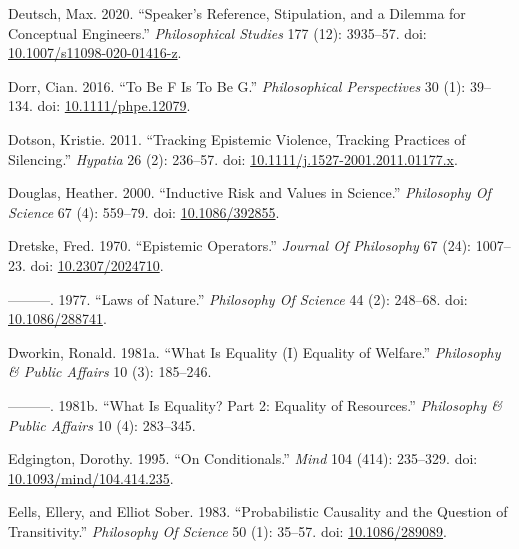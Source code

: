 \documentclass[
  10pt,
  letterpaper,
  DIV=11,
  numbers=noendperiod,
  twoside]{scrartcl}
\newlength{\cslhangindent}
\newenvironment{CSLReferences}[2] %
 {\begin{list}{}{%
  \setlength{\itemindent}{0pt}
  \setlength{\leftmargin}{0pt}
  \setlength{\parsep}{0pt}
  \ifodd #1
   \setlength{\leftmargin}{\cslhangindent}
   \setlength{\itemindent}{-1\cslhangindent}
  \fi
  \setlength{\itemsep}{#2\baselineskip}}}
 {\end{list}}
\begin{document}
\begin{CSLReferences}{1}{0}
Deutsch, Max. 2020. {``Speaker's Reference, Stipulation, and a Dilemma
for Conceptual Engineers.''} \emph{Philosophical Studies} 177 (12):
3935--57. doi:
\href{https://doi.org/10.1007/s11098-020-01416-z}{10.1007/s11098-020-01416-z}.

Dorr, Cian. 2016. {``To Be F Is To Be G.''} \emph{Philosophical
Perspectives} 30 (1): 39--134. doi:
\href{https://doi.org/10.1111/phpe.12079}{10.1111/phpe.12079}.

Dotson, Kristie. 2011. {``Tracking Epistemic Violence, Tracking
Practices of Silencing.''} \emph{Hypatia} 26 (2): 236--57. doi:
\href{https://doi.org/10.1111/j.1527-2001.2011.01177.x}{10.1111/j.1527-2001.2011.01177.x}.

Douglas, Heather. 2000. {``Inductive Risk and Values in Science.''}
\emph{Philosophy Of Science} 67 (4): 559--79. doi:
\href{https://doi.org/10.1086/392855}{10.1086/392855}.

Dretske, Fred. 1970. {``Epistemic Operators.''} \emph{Journal Of
Philosophy} 67 (24): 1007--23. doi:
\href{https://doi.org/10.2307/2024710}{10.2307/2024710}.

---------. 1977. {``Laws of Nature.''} \emph{Philosophy Of Science} 44
(2): 248--68. doi:
\href{https://doi.org/10.1086/288741}{10.1086/288741}.

Dworkin, Ronald. 1981a. {``What Is Equality (I) Equality of Welfare.''}
\emph{Philosophy \& Public Affairs} 10 (3): 185--246.

---------. 1981b. {``What Is Equality? Part 2: Equality of Resources.''}
\emph{Philosophy \& Public Affairs} 10 (4): 283--345.

Edgington, Dorothy. 1995. {``On Conditionals.''} \emph{Mind} 104 (414):
235--329. doi:
\href{https://doi.org/10.1093/mind/104.414.235}{10.1093/mind/104.414.235}.

Eells, Ellery, and Elliot Sober. 1983. {``Probabilistic Causality and
the Question of Transitivity.''} \emph{Philosophy Of Science} 50 (1):
35--57. doi: \href{https://doi.org/10.1086/289089}{10.1086/289089}.


\end{CSLReferences}
\end{document}

